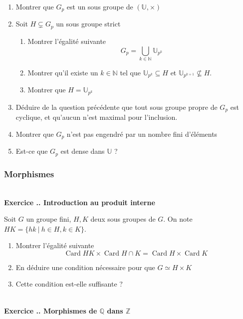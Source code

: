 \documentclass{article}
\newcommand{\mb}[1]{\mathbb{#1}}
\newcommand{\card}{\operatorname{Card}}
\newcounter{exo}
\newcommand{\exercice}[1][\null]{\textbf{\\ Exercice \thesection.\theexo. #1} \addtocounter{exo}{1}}
\begin{document}
\begin{enumerate}
    \item Montrer que $G_p$ est un sous groupe de $(\mb{U}, \times)$
    \item Soit $H \subsetneq G_p$ un sous groupe strict
        \begin{enumerate}
            \item Montrer l'égalité suivante
                \begin{equation*}
                    G_p = \bigcup_{k \in \mb{N}} \mb{U}_{p^k} 
                \end{equation*}
            \item Montrer qu'il existe un $k \in \mb{N}$ tel 
                que $\mb{U}_{p^k} \subseteq H$ et $\mb{U}_{p^{k+1}} \not
                \subseteq H$.
            \item Montrer que $H = \mb{U}_{p^k}$
        \end{enumerate}
    \item Déduire de la question précédente que tout sous groupe propre 
        de $G_p$ est cyclique, et qu'aucun n'est maximal pour l'inclusion.

    \item Montrer que $G_p$ n'est pas engendré par un nombre fini d'éléments
    \item Est-ce que $G_p$ est dense dans $\mb{U}$ ?
\end{enumerate}


\subsubsection{Morphismes}

\exercice[Introduction au produit interne]

Soit $G$ un groupe fini, $H,K$ deux sous groupes de $G$. 
On note $HK = \{ h k ~|~ h \in H, k \in K \}$.

\begin{enumerate}
    \item Montrer l'égalité suivante 
\begin{equation*}
    \card HK \times \card H \cap K = \card H \times \card K
\end{equation*}
    \item En déduire une condition nécessaire pour 
        que $G \simeq H \times K$
    \item Cette condition est-elle suffisante ?
\end{enumerate}

\exercice[Morphismes de $\mb{Q}$ dans $\mb{Z}$]
\end{document}

